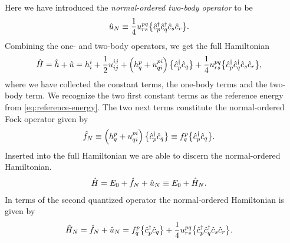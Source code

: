         Here we have introduced the \emph{normal-ordered two-body operator} to
        be
        \begin{align}
            \hat{u}_N
            &\equiv
            \frac{1}{4}u^{pq}_{rs}\bigl\{ 
                \hat{c}_{p}^{\dagger}
                \hat{c}_{q}^{\dagger}
                \hat{c}_{s}
                \hat{c}_{r}
             \bigr\}.
        \end{align}
        Combining the one- and two-body operators, we get the full Hamiltonian
        \begin{align}
            \hat{H}
            &=
            \hat{h} + \hat{u}
            =
            h^{i}_{i}
            + \frac{1}{2} u^{ij}_{ij}
            + \left( 
                h^{p}_{q}
                +
                u^{pi}_{qi}
             \right)
            \bigl\{ 
                \hat{c}_{p}^{\dagger}
                \hat{c}_{q}
             \bigr\}
            +
            \frac{1}{4}u^{pq}_{rs}
            \bigl\{ 
                \hat{c}_{p}^{\dagger}
                \hat{c}_{q}^{\dagger}
                \hat{c}_{s}
                \hat{c}_{r}
             \bigr\},
        \end{align}
        where we have collected the constant terms, the one-body terms and the
        two-body term.
        We recognize the two first constant terms as the reference energy from
        \autoref{eq:reference-energy}.
        The two next terms constitute the normal-ordered Fock operator given by
        \begin{align}
            \hat{f}_N
            &\equiv
            \left( 
                h^{p}_{q}
                +
                u^{pi}_{qi}
             \right)
            \bigl\{ 
                \hat{c}_{p}^{\dagger}
                \hat{c}_{q}
             \bigr\}
            \equiv
            f^{p}_{q}
            \bigl\{ 
                \hat{c}_{p}^{\dagger}
                \hat{c}_{q}
             \bigr\}.
        \end{align}
        Inserted into the full Hamiltonian we are able to discern the
        normal-ordered Hamiltonian.
        \begin{align}
            \hat{H}
            &=
            E_{0}
            +
            \hat{f}_N
            +
            \hat{u}_N
            \equiv
            E_{0}
            +
            \hat{H}_N.
        \end{align}
        In terms of the second quantized operator the normal-ordered Hamiltonian
        is given by
        \begin{align}
            \hat{H}_N
            &=
            \hat{f}_N + \hat{u}_N
            =
            f^{p}_{q}\bigl\{ 
                \hat{c}_{p}^{\dagger}
                \hat{c}_{q}
             \bigr\}
            +
            \frac{1}{4}
            u^{pq}_{rs}\bigl\{ 
                \hat{c}_{p}^{\dagger}
                \hat{c}_{q}^{\dagger}
                \hat{c}_{s}
                \hat{c}_{r}
             \bigr\}.
        \end{align}
